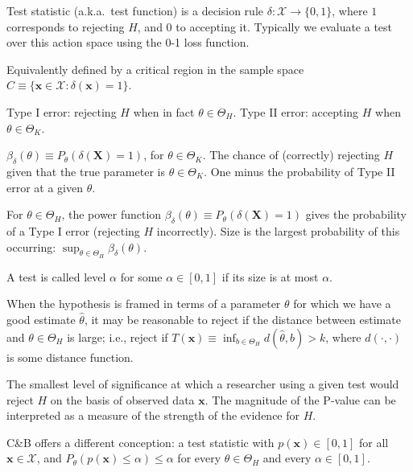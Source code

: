 \documentclass[8pt,letterpaper, landscape]{extarticle} %
\newcommand{\mX}{\ensuremath{\mathbf{X}}}
\newcommand{\mx}{\ensuremath{\mathbf{x}}}
\begin{document}
\begin{multicols}{3}
\begin{description}
 Test statistic (a.k.a.\ test function) is a decision rule $ \delta \colon \mathcal{X} \to \{ 0, 1 \} $, where $ 1 $ corresponds to rejecting $ H $, and $ 0 $ to accepting it. Typically we evaluate a test over this action space using the 0-1 loss function.

Equivalently defined by a critical region in the sample space $ C \equiv \{ \mx \in \mathcal{X} \colon \delta (\mx) = 1 \} $.

 Type I error: rejecting $ H $ when in fact $ \theta \in \Theta_H $. Type II error: accepting $ H $ when $ \theta \in \Theta_K $.

 $ \beta_\delta (\theta) \equiv P_\theta (\delta (\mX) = 1) $, for $ \theta \in \Theta_K $. The chance of (correctly) rejecting $ H $ given that the true parameter is $ \theta \in \Theta_K $. One minus the probability of Type II error at a given $ \theta $.

 For $ \theta \in \Theta_H $, the power function $ \beta_\delta (\theta) \equiv P_\theta (\delta (\mX) = 1) $ gives the probability of a Type I error (rejecting $ H $ incorrectly). Size is the largest probability of this occurring: $ \sup_{\theta \in \Theta_H} \beta_{\delta} (\theta) $.

 A test is called level $ \alpha $ for some $ \alpha \in [0,1] $ if its size is at most $ \alpha $.

 When the hypothesis is framed in terms of a  parameter $ \theta $ for which we have a good estimate $ \hat{\theta} $, it may be reasonable to reject if the distance between estimate and $ \theta \in \Theta_H $ is large; i.e., reject if $ T(\mx) \equiv \inf_{b \in \Theta_H} d(\hat{\theta}, b) > k $, where $ d(\cdot, \cdot) $ is some distance function.

 The smallest level of significance at which a researcher using a given test would reject $ H $ on the basis of observed data $ \mx $. The magnitude of the P-value can be interpreted as a measure of the strength of the evidence for $ H $.

C\&B offers a different conception: a test statistic with $ p(\mx) \in [0,1] $ for all $ \mx \in \mathcal{X} $, and $ P_{\theta} (p(\mx) \leq \alpha) \leq \alpha $ for every $ \theta \in \Theta_H $ and every $ \alpha \in [0,1] $.


\end{description}
\end{multicols}
\end{document}
